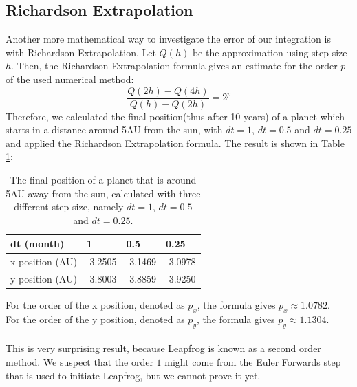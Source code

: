 \subsection{Richardson Extrapolation}
Another more mathematical way to investigate the error of our integration is with Richardson Extrapolation. Let $Q(h)$ be the approximation using step size $h$. Then, the Richardson Extrapolation formula gives an estimate for the order $p$ of the used numerical method:
\[\frac{Q(2h)-Q(4h)}{Q(h)-Q(2h)}=2^p\]
Therefore, we calculated the final position(thus after 10 years) of a planet which starts in a distance around 5AU from the sun, with $dt=1$, $dt=0.5$ and $dt=0.25$ and applied the Richardson Extrapolation formula. The result is shown in Table \ref{tab:Richardson5AU}:
\begin{table}[htb]
\centering
\caption{The final position of a planet that is around 5AU away from the sun, calculated with three different step size, namely $dt=1$, $dt=0.5$ and $dt=0.25$.}
\begin{tabular}{|l|l|l|l|}
\hline
dt (month)&1&0.5&0.25\\ \hline
x position (AU)&-3.2505&   -3.1469&   -3.0978\\ \hline
y position (AU)&   -3.8003&   -3.8859&   -3.9250\\ \hline
\end{tabular}
\label{tab:Richardson5AU}
\end{table}
\newline
For the order of the x position, denoted as $p_x$, the formula gives $p_x\approx 1.0782$.\\
For the order of the y position, denoted as $p_y$, the formula gives $p_y\approx 1.1304$.\\ 
\\
This is very surprising result, because Leapfrog is known as a second order method. We suspect that the order $1$ might come from the Euler Forwards step that is used to initiate Leapfrog, but we cannot prove it yet.